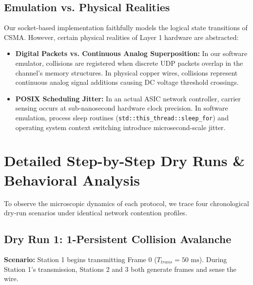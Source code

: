 \documentclass[12pt, a4paper]{article}
\begin{document}
\subsection{Emulation vs. Physical Realities}
Our socket-based implementation faithfully models the logical state transitions of CSMA. However, certain physical realities of Layer 1 hardware are abstracted:
\begin{itemize}
    \item \textbf{Digital Packets vs. Continuous Analog Superposition:} In our software emulator, collisions are registered when discrete UDP packets overlap in the channel's memory structures. In physical copper wires, collisions represent continuous analog signal additions causing DC voltage threshold crossings.
    \item \textbf{POSIX Scheduling Jitter:} In an actual ASIC network controller, carrier sensing occurs at sub-nanosecond hardware clock precision. In software emulation, process sleep routines (\texttt{std::this\_thread::sleep\_for}) and operating system context switching introduce microsecond-scale jitter.
\end{itemize}


\section{Detailed Step-by-Step Dry Runs \& Behavioral Analysis}

To observe the microscopic dynamics of each protocol, we trace four chronological dry-run scenarios under identical network contention profiles.

\subsection{Dry Run 1: 1-Persistent Collision Avalanche}
\textbf{Scenario:} Station 1 begins transmitting Frame 0 ($T_{trans} = 50\text{ ms}$). During Station 1's transmission, Stations 2 and 3 both generate frames and sense the wire.
\end{document}
